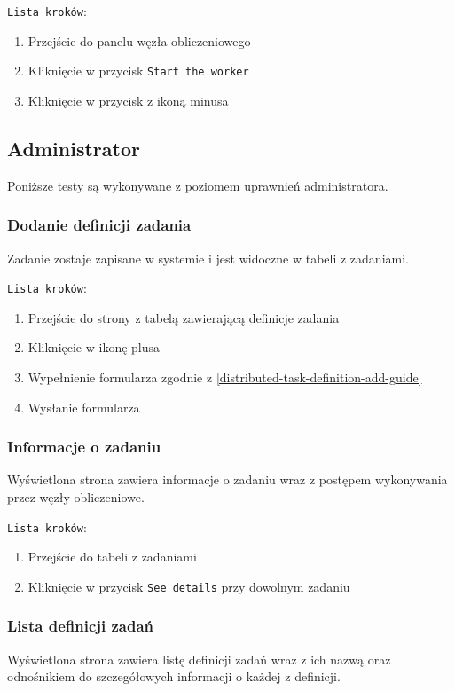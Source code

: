 \documentclass[a4paper,11pt,twoside]{report}
\theoremstyle{definition}
\begin{document}
				\texttt{Lista kroków}:
				\begin{enumerate}
					\item Przejście do panelu węzła obliczeniowego
					\item Kliknięcie w przycisk \texttt{Start the worker}
					\item Kliknięcie w przycisk z ikoną minusa
				\end{enumerate}

		\subsection{Administrator}
			Poniższe testy są wykonywane z poziomem uprawnień administratora.

    		\subsubsection{Dodanie definicji zadania}	
				Zadanie zostaje zapisane w systemie i jest widoczne w tabeli z zadaniami. 

				\texttt{Lista kroków}:
				\begin{enumerate}
		            \item Przejście do strony z tabelą zawierającą definicje zadania
					\item Kliknięcie w ikonę plusa
					\item Wypełnienie formularza zgodnie z \ref{distributed-task-definition-add-guide}
					\item Wysłanie formularza
				\end{enumerate}

    		\subsubsection{Informacje o zadaniu}	
				Wyświetlona strona zawiera informacje o zadaniu wraz z postępem wykonywania przez węzły obliczeniowe. 
				
				\texttt{Lista kroków}:
				\begin{enumerate}
					\item Przejście do tabeli z zadaniami
					\item Kliknięcie w przycisk \texttt{See details} przy dowolnym zadaniu
				\end{enumerate}

    		\subsubsection{Lista definicji zadań}	
    			Wyświetlona strona zawiera listę definicji zadań wraz z ich nazwą oraz odnośnikiem do szczegółowych informacji o każdej z definicji.
\end{document}
